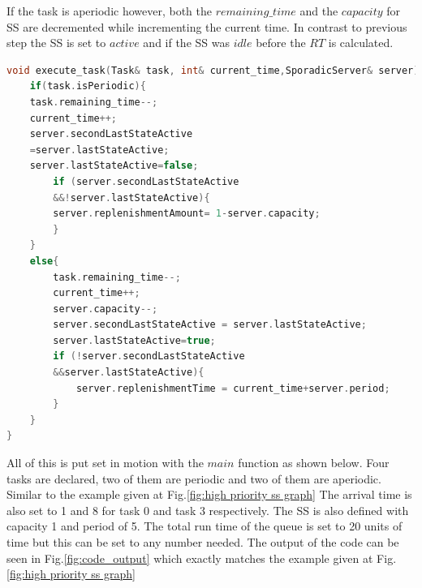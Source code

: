 \documentclass[conference]{IEEEtran}
\begin{document}
If the task is aperiodic however, both the \textit{$remaining\_time$} and the $capacity$ for SS are decremented while incrementing the current time. In contrast to previous step the SS is set to $active$ and if the SS was $idle$ before the $RT$ is calculated.
\begin{lstlisting}[language=C++]
void execute_task(Task& task, int& current_time,SporadicServer& server) {
    if(task.isPeriodic){
    task.remaining_time--;
    current_time++;
    server.secondLastStateActive
    =server.lastStateActive;
    server.lastStateActive=false;
        if (server.secondLastStateActive
        &&!server.lastStateActive){
        server.replenishmentAmount= 1-server.capacity;
        }
    }
    else{
        task.remaining_time--;
        current_time++;
        server.capacity--;
        server.secondLastStateActive = server.lastStateActive;
        server.lastStateActive=true;
        if (!server.secondLastStateActive
        &&server.lastStateActive){
            server.replenishmentTime = current_time+server.period;
        }
    }
}
\end{lstlisting}
All of this is put set in motion with the $main$ function as shown below. Four tasks are declared, two of them are periodic and two of them are aperiodic. Similar to the example given at Fig.\ref{fig:high priority ss graph} The arrival time is also set to 1 and 8 for task 0 and task 3 respectively. The SS is also defined with capacity 1 and period of 5. The total run time of the queue is set to 20 units of time but this can be set to any number needed. The output of the code can be seen in Fig.\ref{fig:code_output} which exactly matches the example given at Fig.\ref{fig:high priority ss graph}
\end{document}
